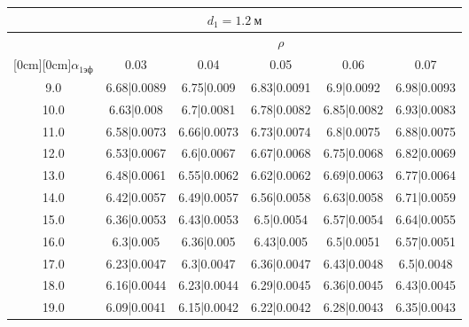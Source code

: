 \documentclass[20pt]{article}
\begin{document}
\begin{center}
\begin{tabular}{c|ccccc}
\hline
	\multicolumn{6}{c}{$d_{1}=1.2 \ м$} \\
\hline
	 & \multicolumn{5}{|c}{$\rho$} \\
	\cline{2-6}
	\raisebox{1.5ex}[0cm][0cm]{$\alpha_{1эф}$} & 0.03 & 0.04 & 0.05 & 0.06 & 0.07\\
\hline
	9.0 & 	6.68|0.0089 & 	6.75|0.009 & 	6.83|0.0091 & 	6.9|0.0092 & 	6.98|0.0093\\
	10.0 & 	6.63|0.008 & 	6.7|0.0081 & 	6.78|0.0082 & 	6.85|0.0082 & 	6.93|0.0083\\
	11.0 & 	6.58|0.0073 & 	6.66|0.0073 & 	6.73|0.0074 & 	6.8|0.0075 & 	6.88|0.0075\\
	12.0 & 	6.53|0.0067 & 	6.6|0.0067 & 	6.67|0.0068 & 	6.75|0.0068 & 	6.82|0.0069\\
	13.0 & 	6.48|0.0061 & 	6.55|0.0062 & 	6.62|0.0062 & 	6.69|0.0063 & 	6.77|0.0064\\
	14.0 & 	6.42|0.0057 & 	6.49|0.0057 & 	6.56|0.0058 & 	6.63|0.0058 & 	6.71|0.0059\\
	15.0 & 	6.36|0.0053 & 	6.43|0.0053 & 	6.5|0.0054 & 	6.57|0.0054 & 	6.64|0.0055\\
	16.0 & 	6.3|0.005 & 	6.36|0.005 & 	6.43|0.005 & 	6.5|0.0051 & 	6.57|0.0051\\
	17.0 & 	6.23|0.0047 & 	6.3|0.0047 & 	6.36|0.0047 & 	6.43|0.0048 & 	6.5|0.0048\\
	18.0 & 	6.16|0.0044 & 	6.23|0.0044 & 	6.29|0.0045 & 	6.36|0.0045 & 	6.43|0.0045\\
	19.0 & 	6.09|0.0041 & 	6.15|0.0042 & 	6.22|0.0042 & 	6.28|0.0043 & 	6.35|0.0043\\
\end{tabular}

\end{center}
\end{document}
